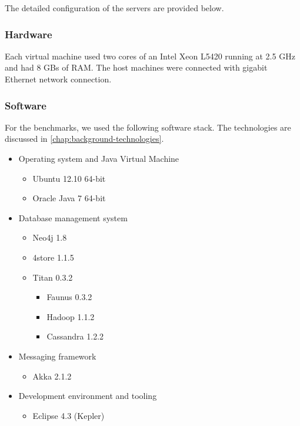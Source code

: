 The detailed configuration of the servers are provided below.

\subsubsection{Hardware}
 
Each virtual machine used two cores of an Intel Xeon L5420 running at 2.5 GHz and had 8 GBs of RAM. The host machines were connected with gigabit Ethernet network connection.

\subsubsection{Software}

For the benchmarks, we used the following software stack. The technologies are discussed in \autoref{chap:background-technologies}.

\begin{itemize}
  \item Operating system and Java Virtual Machine
  \begin{itemize}
    \item Ubuntu 12.10 64-bit
    \item Oracle Java 7 64-bit
  \end{itemize}  
  
  \item Database management system
  \begin{itemize}
    \item Neo4j 1.8
    \item 4store 1.1.5
    \item Titan 0.3.2
    \begin{itemize}
      \item Faunus 0.3.2
      \item Hadoop 1.1.2
      \item Cassandra 1.2.2
    \end{itemize}
  \end{itemize}  

  \item Messaging framework
  \begin{itemize}
    \item Akka 2.1.2
  \end{itemize}  

  \item Development environment and tooling 
  \begin{itemize}
    \item Eclipse 4.3 (Kepler)
  \end{itemize}  
\end{itemize}


